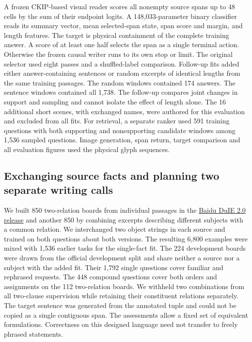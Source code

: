 \documentclass[12pt,a4paper]{article}
\providecommand{\DIFadd}[1]{{\protect\color{blue} \sf #1}} %
\begin{document}
\DIFadd{A frozen CKIP-based visual reader scores all nonempty source spans up to 48 cells by the sum of their endpoint logits. A 148,033-parameter binary classifier reads its summary vector, mean selected-span state, span score and margin, and length features. The target is physical containment of the complete training answer. A score of at least one half selects the span as a single terminal action. Otherwise the frozen causal writer runs to its own stop or limit. The original selector used eight passes and a shuffled-label comparison. Follow-up fits added either answer-containing sentences or random excerpts of identical lengths from the same training passages. The random windows contained 174 answers. The sentence windows contained all 1,738. The follow-up compares joint changes in support and sampling and cannot isolate the effect of length alone. The 16 additional short scenes, with exchanged names, were authored for this evaluation and excluded from all fits. For retrieval, a separate ranker used 591 training questions with both supporting and nonsupporting candidate windows among 1,536 sampled questions. Image generation, span return, target comparison and all evaluation figures used the physical glyph sequences.
}

\subsection*{\DIFadd{Exchanging source facts and planning two separate writing calls}}
\DIFadd{We built 850 two-relation boards from individual passages in the }\href{https://github.com/PaddlePaddle/PaddleNLP/issues/447}{\DIFadd{Baidu DuIE 2.0 release}} \DIFadd{and another 850 by combining excerpts describing different subjects with a common relation. We interchanged two object strings in each source and trained on both questions about both versions. The resulting 6,800 examples were mixed with 1,536 earlier tasks for the single-fact fit. The 224 development boards were drawn from the official development split and share neither a source nor a subject with the added fit. Their 1,792 single questions cover familiar and rephrased requests. The 448 compound questions cover both orders and assignments on the 112 two-relation boards. We withheld two combinations from all two-clause supervision while retaining their constituent relations separately. The target sentence was generated from the annotated tuple and could not be copied as a single contiguous span. The assessments allow a fixed set of equivalent formulations. Correctness on this designed language need not transfer to freely phrased statements.
}
\end{document}

